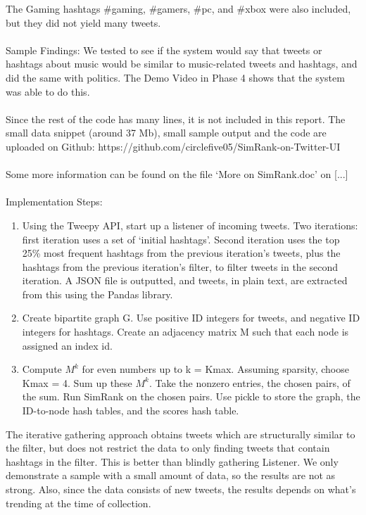 \documentclass[10pt]{article}
\begin{document}
The Gaming hashtags \#gaming, \#gamers, \#pc, and \#xbox were also included, but they did not yield many tweets.
\\\\
Sample Findings: We tested to see if the system would say that tweets or hashtags about music would be similar to music-related tweets and hashtags, and did the same with politics. The Demo Video in Phase 4 shows that the system was able to do this.
\\\\
Since the rest of the code has many lines, it is not included in this report. The small data snippet (around 37 Mb), small sample output and the code are uploaded on Github: 
https://github.com/circlefive05/SimRank-on-Twitter-UI
\\\\
Some more information can be found on the file ‘More on SimRank.doc’ on [...]
\\\\
Implementation Steps:
\begin{enumerate}
	\item Using the Tweepy API, start up a listener of incoming tweets. Two iterations: first iteration uses a set of ‘initial hashtags’. Second iteration uses the top 25\% most frequent hashtags from the previous iteration’s tweets, plus the hashtags from the previous iteration’s filter, to filter tweets in the second iteration. A JSON file is outputted, and tweets, in plain text, are extracted from this using the Pandas library.
\item Create bipartite graph G. Use positive ID integers for tweets, and negative ID integers for hashtags. Create an adjacency matrix M such that each node is assigned an index id.
\item Compute $M^k$ for even numbers up to k = Kmax. Assuming sparsity, choose Kmax = 4. Sum up these $M^k$. Take the nonzero entries, the chosen pairs, of the sum. Run SimRank on the chosen pairs. Use pickle to store the graph, the ID-to-node hash tables, and the scores hash table. 
\end{enumerate}	
The iterative gathering approach obtains tweets which are structurally similar to the filter, but does not restrict the data to only finding tweets that contain hashtags in the filter. This is better than blindly gathering Listener. We only demonstrate a sample with a small amount of data, so the results are not as strong. Also, since the data consists of new tweets, the results depends on what’s trending at the time of collection.


\end{document}
